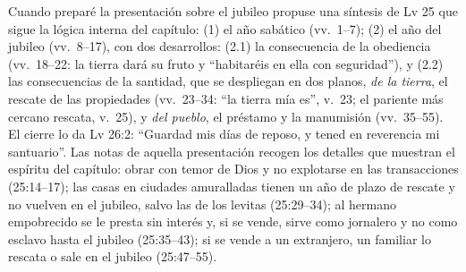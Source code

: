 \documentclass[11pt,letterpaper]{article}
\begin{document}
Cuando preparé la presentación sobre el jubileo propuse una síntesis de Lv 25 que sigue la lógica interna del capítulo: (1) el año sabático (vv.~1--7); (2) el año del jubileo (vv.~8--17), con dos desarrollos: (2.1) la consecuencia de la obediencia (vv.~18--22: la tierra dará su fruto y ``habitaréis en ella con seguridad''), y (2.2) las consecuencias de la santidad, que se despliegan en dos planos, \emph{de la tierra}, el rescate de las propiedades (vv.~23--34: ``la tierra mía es'', v.~23; el pariente más cercano rescata, v.~25), y \emph{del pueblo}, el préstamo y la manumisión (vv.~35--55). El cierre lo da Lv 26:2: ``Guardad mis días de reposo, y tened en reverencia mi santuario''. Las notas de aquella presentación recogen los detalles que muestran el espíritu del capítulo: obrar con temor de Dios y no explotarse en las transacciones (25:14--17); las casas en ciudades amuralladas tienen un año de plazo de rescate y no vuelven en el jubileo, salvo las de los levitas (25:29--34); al hermano empobrecido se le presta sin interés y, si se vende, sirve como jornalero y no como esclavo hasta el jubileo (25:35--43); si se vende a un extranjero, un familiar lo rescata o sale en el jubileo (25:47--55).
\end{document}
